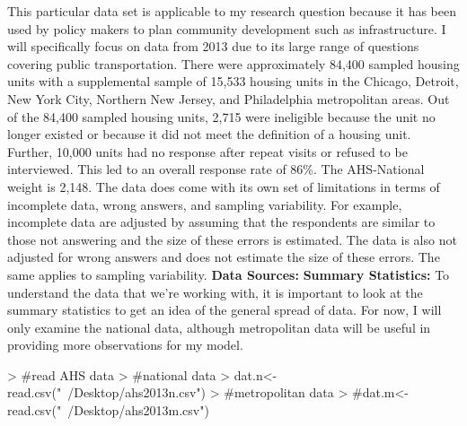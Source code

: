\documentclass{article}
\begin{document}
\newline
\newline This particular data set is applicable to my research question because it has been used by policy makers to plan community development such as infrastructure. I will specifically focus on data from 2013 due to its large range of questions covering public transportation. There were approximately 84,400 sampled housing units with a supplemental sample of 15,533 housing units in the Chicago, Detroit, New York City, Northern New Jersey, and Philadelphia metropolitan areas. Out of the 84,400 sampled housing units, 2,715 were ineligible because the unit no longer existed or because it did not meet the definition of a housing unit. Further, 10,000 units had no response after repeat visits or refused to be interviewed. This led to an overall response rate of 86\%. The AHS-National weight is 2,148.
\newline
\newline The data does come with its own set of limitations in terms of incomplete data, wrong answers, and sampling variability. For example, incomplete data are adjusted by assuming that the respondents are similar to those not answering and the size of these errors is estimated. The data is also not adjusted for wrong answers and does not estimate the size of these errors. The same applies to sampling variability. 
\newline
\newline \noindent \textbf{Data Sources:}
\newline
\newline \noindent \textbf{Summary Statistics:}
\newline To understand the data that we're working with, it is important to look at the summary statistics to get an idea of the general spread of data. For now, I will only examine the national data, although metropolitan data will be useful in providing more observations for my model. 

\begin{Schunk}
\begin{Sinput}
> #read AHS data
> #national data
> dat.n<-read.csv("~/Desktop/ahs2013n.csv")
> #metropolitan data
> #dat.m<-read.csv("~/Desktop/ahs2013m.csv")
\end{Sinput}
\end{Schunk}
\end{document}
